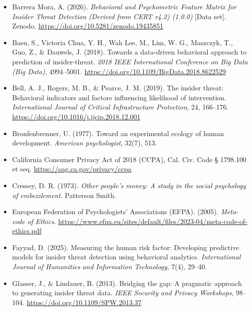 \documentclass[IB]{TFUOC}%
\begin{document}
\begin{itemize}
    \item Barrera Mora, A. (2026). \textit{Behavioral and Psychometric Feature Matrix for Insider Threat Detection (Derived from CERT r4.2) (1.0.0)} [Data set]. Zenodo. \url{https://doi.org/10.5281/zenodo.19435851}

    \item Basu, S., Victoria Chua, Y. H., Wah Lee, M., Lim, W. G., 
    Maszczyk, T., Guo, Z., \& Dauwels, J. (2018). Towards a data-driven 
    behavioral approach to prediction of insider-threat. \textit{2018 IEEE 
    International Conference on Big Data (Big Data)}, 4994--5001. 
    \url{https://doi.org/10.1109/BigData.2018.8622529}

    \item Bell, A. J., Rogers, M. B., \& Pearce, J. M. (2019). The insider 
    threat: Behavioral indicators and factors influencing likelihood of 
    intervention. \textit{International Journal of Critical Infrastructure 
    Protection}, 24, 166--176. 
    \url{https://doi.org/10.1016/j.ijcip.2018.12.001}

    \item Bronfenbrenner, U. (1977). Toward an experimental ecology of human development. \textit{American psychologist}, 32(7), 513.

    \item California Consumer Privacy Act of 2018 (CCPA), Cal. Civ. Code § 1798.100 et seq. \url{https://oag.ca.gov/privacy/ccpa}

    \item Cressey, D. R. (1973). \textit{Other people's money: A study in 
    the social psychology of embezzlement}. Patterson Smith.

    \item European Federation of Psychologists' Associations (EFPA). (2005). \textit{Meta-code of Ethics}.
    \url{https://www.efpa.eu/sites/default/files/2023-04/meta-code-of-ethics.pdf}

    \item Fayyad, D. (2025). Measuring the human risk factor: Developing 
    predictive models for insider threat detection using behavioral analytics. 
    \textit{International Journal of Humanities and Information Technology}, 
    7(4), 29--40.

    \item Glasser, J., \& Lindauer, B. (2013). Bridging the gap: A pragmatic 
    approach to generating insider threat data. \textit{IEEE Security and 
    Privacy Workshops}, 98--104. 
    \url{https://doi.org/10.1109/SPW.2013.37}


\end{itemize}
\end{document}
